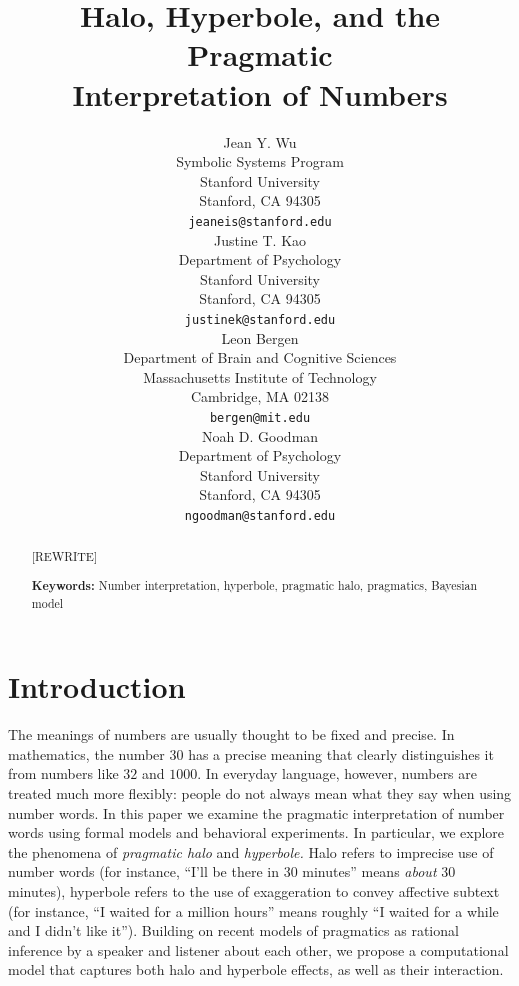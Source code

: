 \documentclass{article} %
\title{Halo, Hyperbole, and the Pragmatic \\ Interpretation of Numbers}
\author{
Jean Y. Wu \\
Symbolic Systems Program\\
Stanford University\\
Stanford, CA 94305 \\
\texttt{jeaneis@stanford.edu} \\
\And
Justine T. Kao \\
Department of Psychology\\
Stanford University \\
Stanford, CA 94305 \\
\texttt{justinek@stanford.edu} \\
\AND
Leon Bergen \\
Department of Brain and Cognitive Sciences\\
Massachusetts Institute of Technology \\
Cambridge, MA 02138\\
\texttt{bergen@mit.edu} \\
\And
Noah D. Goodman \\
Department of Psychology\\
Stanford University \\ 
Stanford, CA 94305\\
\texttt{ngoodman@stanford.edu} \\
}
\begin{document}
\maketitle

\begin{abstract}
[REWRITE] 

\textbf{Keywords:} 
Number interpretation, hyperbole, pragmatic halo, pragmatics, Bayesian model
\end{abstract}


\section{Introduction}

The meanings of numbers are usually thought to be fixed and precise. In mathematics, the number $30$ has a precise meaning that clearly distinguishes it from numbers like $32$ and $1000$. In everyday language, however, numbers are treated much more flexibly: people do not always mean what they say when using number words. In this paper we examine the pragmatic interpretation of number words using formal models and behavioral experiments.
In particular, we explore the phenomena of \emph{pragmatic halo} and \emph{hyperbole.} Halo refers to imprecise use of number words (for instance, ``I'll be there in 30 minutes'' means \emph{about} 30 minutes), hyperbole refers to the use of exaggeration to convey affective subtext (for instance, ``I waited for a million hours'' means roughly ``I waited for a while and I didn't like it'').
Building on recent models of pragmatics as rational inference by a speaker and listener about each other, we propose a computational model that captures both halo and hyperbole effects, as well as their interaction.
\end{document}
